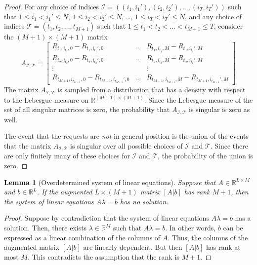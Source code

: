 \documentclass[12pt]{article}
\newcommand{\R}{\mathbb{R}}
\newcommand{\T}{\mathcal{T}}
\newcommand{\I}{\mathcal{I}}
\newtheorem{lemma}[theorem]{Lemma}
\theoremstyle{definition}
\begin{document}
\begin{proof}
For any choice of indices $\I = ((i_1,i_1'), (i_2,i_2'), \dots, (i_T,i_T'))$
such that $1 \le i_1 < i_1' \le N$, $1 \le i_2 < i_2' \le N$, \dots, $1 \le i_T
< i_T' \le N$, and any choice of indices $\T = (t_1, t_2, \dots, t_{M+1})$ such
that $1 \le t_1 < t_2 < \dots < t_{M+1} \le T$, consider the $(M+1) \times
(M+1)$ matrix
$$
A_{\I,\T}
= \begin{bmatrix}
R_{t_1,i_{t_1},0} - R_{t_1,i_{t_1}',0} &  \dots & R_{t_1,i_{t_1},M} - R_{t_1,i_{t_1}',M} \\
R_{t_2,i_{t_2},0} - R_{t_2,i_{t_2}',0} &  \dots & R_{t_2,i_{t_2},M} - R_{t_2,i_{t_2}',M} \\
 \vdots & & \vdots \\
R_{t_{M+1},i_{t_{M+1}},0} - R_{t_{M+1},i_{t_{M+1}}',0} & \dots & R_{t_{M+1},i_{t_{M+1}},M} - R_{t_{M+1},i_{t_{M+1}}',M}
\end{bmatrix}
$$
The matrix $A_{\I,\T}$ is sampled from a distribution that has a density with
respect to the Lebesgue measure on $\R^{(M+1) \times (M+1)}$. Since the Lebesgue
measure of the set of all singular matrices is zero, the probability that
$A_{\I,\T}$ is singular is zero as well.

The event that the requests are \emph{not} in general position is the union of
the events that the matrix $A_{\I,\T}$ is singular over all possible choices of
$\I$ and $\T$. Since there are only finitely many of these choices for $\I$ and
$\T$, the probability of the union is zero.
\end{proof}

\begin{lemma}[Overdetermined system of linear equations]
\label{lemma:overdetermined-system-of-linear-equations}
Suppose that $A \in \R^{L \times M}$ and $b \in \R^L$. If the augmented
$L \times (M+1)$ matrix $[A | b]$ has rank $M+1$, then the system of linear
equations $A \lambda = b$ has no solution.
\end{lemma}

\begin{proof}
Suppose by contradiction that the system of linear equations $A \lambda = b$ has
a solution. Then, there exists $\lambda \in \R^M$ such that $A \lambda = b$. In
other words, $b$ can be expressed as a linear combination of the columns of $A$.
Thus, the columns of the augmented matrix $[A | b]$ are linearly dependent. But
then $[A | b]$ has rank at most $M$. This contradicts the assumption that the
rank is $M+1$.
\end{proof}
\end{document}
